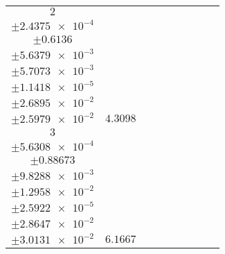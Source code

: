 \documentclass[8pt]{article}
\begin{document}
\begin{longtable}[l]{c c c c c c c c c}
$\num{2}$ & \begin{tabular}[c]{@{}c@{}}$\num{3.2188e-2}$ \\ $\pm\num{2.4375e-4}$\end{tabular} & \begin{tabular}[c]{@{}c@{}}$\num{-5.1237}$ \\ $\pm\num{0.6136}$\end{tabular} & \begin{tabular}[c]{@{}c@{}}$\num{-5.6185}$ \\ $\pm\num{5.6379e-3}$\end{tabular} & \begin{tabular}[c]{@{}c@{}}$\num{2.9511e+3}$ \\ $\pm\num{5.7073e-3}$\end{tabular} & \begin{tabular}[c]{@{}c@{}}$\num{5.9039}$ \\ $\pm\num{1.1418e-5}$\end{tabular} & \begin{tabular}[c]{@{}c@{}}$\num{3.6577}$ \\ $\pm\num{2.6895e-2}$\end{tabular} & \begin{tabular}[c]{@{}c@{}}$\num{3.5992}$ \\ $\pm\num{2.5979e-2}$\end{tabular} & $\num{4.3098}$\\
$\num{3}$ & \begin{tabular}[c]{@{}c@{}}$\num{4.8399e-2}$ \\ $\pm\num{5.6308e-4}$\end{tabular} & \begin{tabular}[c]{@{}c@{}}$\num{4.7697}$ \\ $\pm\num{0.88673}$\end{tabular} & \begin{tabular}[c]{@{}c@{}}$\num{-1.0414}$ \\ $\pm\num{9.8288e-3}$\end{tabular} & \begin{tabular}[c]{@{}c@{}}$\num{2.9557e+3}$ \\ $\pm\num{1.2958e-2}$\end{tabular} & \begin{tabular}[c]{@{}c@{}}$\num{5.9131}$ \\ $\pm\num{2.5922e-5}$\end{tabular} & \begin{tabular}[c]{@{}c@{}}$\num{4.1828}$ \\ $\pm\num{2.8647e-2}$\end{tabular} & \begin{tabular}[c]{@{}c@{}}$\num{4.7123}$ \\ $\pm\num{3.0131e-2}$\end{tabular} & $\num{6.1667}$\\

\end{longtable}
\end{document}
